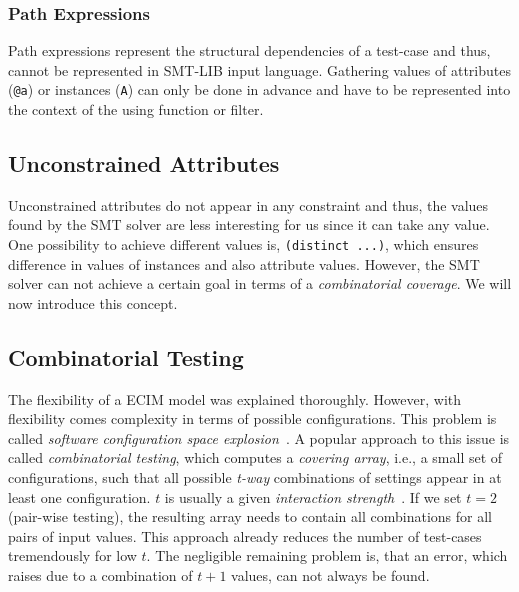 \subsubsection*{Path Expressions}

Path expressions represent the structural dependencies of a test-case and thus, cannot be represented in SMT-LIB input language. Gathering values of attributes (\verb|@a|) or instances (\verb|A|) can only be done in advance and have to be represented into the context of the using function or filter.





\subsection{Unconstrained Attributes}\label{sec:nonconstraint}

Unconstrained attributes do not appear in any constraint and thus, the values found by the SMT solver are less interesting for us since it can take any value. One possibility to achieve different values is, \verb|(distinct ...)|, which ensures difference in values of instances and also attribute values. However, the SMT solver can not achieve a certain goal in terms of a \emph{combinatorial coverage}. We will now introduce this concept.

\subsection{Combinatorial Testing}\label{subsec:combinatorial-testing}

The flexibility of a ECIM model was explained thoroughly. However, with flexibility comes complexity in terms of possible configurations. 
This problem is called \emph{software configuration space explosion}~\cite{interaction-patterns}. A popular approach to this issue is called \emph{combinatorial testing}, which computes a \emph{covering array}, i.e., a small set of configurations, such that all possible \emph{t-way} combinations of settings appear in at least one configuration. $t$ is usually a given \emph{interaction strength}~\cite{interaction-patterns}. 
If we set $t=2$ (pair-wise testing), the resulting array needs to contain all combinations for all pairs of input values. 
This approach already reduces the number of test-cases tremendously for low $t$. The negligible remaining problem is, that an error, which raises due to a combination of $t+1$ values, can not always be found.


